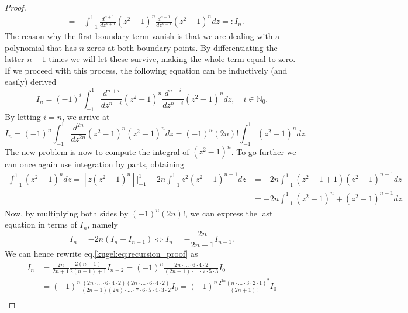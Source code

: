 \begin{proof}
\begin{align*}
    &= - \int_{-1}^1 \frac{d^{n+1}}{dz^{n+1}} (z^2-1)^n \frac{d^{n-1}}{dz^{n-1}} (z^2-1)^n dz =: I_n.
  \end{align*}
  The reason why the first boundary-term vanish is that we are dealing with a polynomial that has $n$ zeros at both boundary points. 
  By differentiating the latter $n-1$ times we will let these survive, making the whole term equal to zero. If we proceed with this process,
  the following equation can be inductively (and easily) derived
  \begin{equation*}
    I_n = (-1)^i \int_{-1}^1 \frac{d^{n+i}}{dz^{n+i}} (z^2-1)^n \frac{d^{n-i}}{dz^{n-i}} (z^2-1)^n dz, \quad i \in \mathbb{N}_0.
  \end{equation*}
  By letting $i=n$, we arrive at
  \begin{equation*}
    I_n = (-1)^n \int_{-1}^1 \frac{d^{2n}}{dz^{2n}} (z^2-1)^n (z^2-1)^n dz = (-1)^n (2n)! \int_{-1}^1 (z^2-1)^n dz.
  \end{equation*}
  The new problem is now to compute the integral of $(z^2-1)^n$. To go further we can once again use integration by parts, obtaining
  \begin{align*}
    \int_{-1}^1 (z^2-1)^n dz =  \left[
       z(z^2-1)^n
      \right] \Bigg|_{-1}^1 -2n \int_{-1}^1 z^2 (z^2-1)^{n-1} dz 
      &= -2n \int_{-1}^1 (z^2-1+1) (z^2-1)^{n-1} dz \\
      &= -2n \int_{-1}^1 (z^2-1)^n + (z^2-1)^{n-1} dz.
  \end{align*}
  Now, by multiplying both sides by $(-1)^n(2n)!$, we can express the last equation in terms of $I_n$, namely
  \begin{equation}
    I_n = -2n ( I_n + I_{n-1} ) \iff I_n = -\frac{2n}{2n+1} I_{n-1}. \label{kugel:eq:recursion_proof}
  \end{equation}
  We can hence rewrite eq.\eqref{kugel:eq:recursion_proof} as
  \begin{align*}
    I_n &= \frac{2n}{2n+1} \frac{2(n-1)}{2(n-1)+1} I_{n-2} = (-1)^n \frac{2n \cdot \hdots \cdot 6\cdot 4\cdot 2}{(2n+1) \cdot \hdots \cdot 7 \cdot 5 \cdot 3} I_0 \\
        &= (-1)^n \frac{(2n \cdot \hdots \cdot 6\cdot 4\cdot 2)(2n \cdot \hdots \cdot 6\cdot 4\cdot 2)}
                       {(2n+1)(2n)\cdot \hdots \cdot 7\cdot 6\cdot 5\cdot 4\cdot 3\cdot 2} I_0 = (-1)^n \frac{2^{2n}(n\cdot \hdots \cdot 3 \cdot 2 \cdot 1)^2}
                                                                                                             {(2n+1)!} I_0 \\

\end{align*}
\end{proof}

